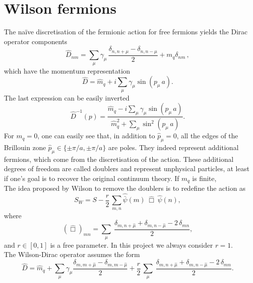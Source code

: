 \chapter{Wilson fermions}
\label{chap:AppendixB}
The na\"ive discretisation of the fermionic action for free fermions yields the Dirac operator components
\begin{equation*}
    \widehat{D}_{nm} = \sum_\mu \gamma_\mu \, \frac{\delta_{n,n+\mu} - \delta_{n,n-\mu}}{2} + m_q \delta_{nm} \, ,
\end{equation*}
which have the momentum representation
\begin{equation*}
    \widehat D = \hat m_q + i \sum_\mu \gamma_\mu \sin \left(p_\mu \, a\right).
\end{equation*}
The last expression can be easily inverted
\begin{equation*}
    \widehat{D}^{-1}(p) = \frac{\hat m_q - i \sum_\mu \gamma_\mu \sin \left(p_\mu \, a\right)}{\hat m_q^2 + \sum_\mu \sin^2 \left(p_\mu \, a \right)}.
\end{equation*}
For $m_q = 0$, one can easily see that, in addition to $\hat{p}_\mu = 0$, all the edges of the Brillouin zone $\hat p_\mu \in \{\pm \pi/a, \pm \pi/a\}$ are poles.
They indeed represent additional fermions, which come from the discretisation of the action. These additional degrees of freedom are called doublers and represent unphysical particles, at least if one's goal is to recover the original continuum theory. 
If $m_q$ is finite,\\
The idea proposed by Wilson to remove the doublers is to redefine the action as
\begin{equation*}
    S_{W} = S - \frac{r}{2} \, \sum_{m,n} \hat{\bar\psi}(m) \ \widehat\Box \ \hat{\psi}(n),
\end{equation*}
where 
\begin{equation*}
    \left(\widehat{\Box}\right)_{mn} = \sum_\mu \ \frac{\delta_{m, n+\hat\mu} + \delta_{m, n-\hat\mu} - 2 \, \delta_{mn}}{2},
\end{equation*}
and $r \in [0,1]$ is a free parameter. In this project we always consider $r=1$.\\
The Wilson-Dirac operator assumes the form
\begin{equation*}
    \widehat D = \hat m_q + \sum_\mu \gamma_\mu \frac{\delta_{m,m+\hat\mu} - \delta_{m,m-\hat\mu}}{2} + \frac{r}{2} \, \sum_\mu \ \frac{\delta_{m, n+\hat\mu} + \delta_{m, n-\hat\mu} - 2 \, \delta_{mn}}{2}.
\end{equation*}
